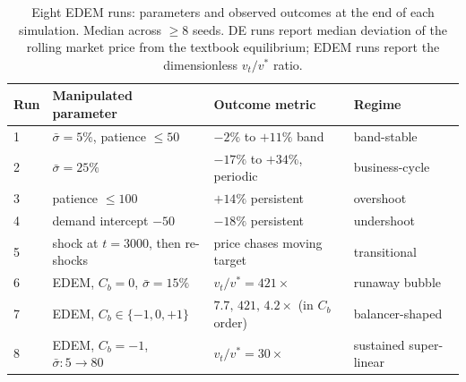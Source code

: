 \begin{table}[t]
\centering
\small
\caption{Eight EDEM runs: parameters and observed outcomes
at the end of each simulation. Median across $\ge 8$ seeds.
DE runs report median deviation of the rolling market price from the
textbook equilibrium; EDEM runs report the dimensionless
$v_{t}/v^{*}$ ratio.}
\label{tab:experiment-summary}
\begin{tabular}{l l l l}
\toprule
\textbf{Run} & \textbf{Manipulated parameter} & \textbf{Outcome metric} & \textbf{Regime} \\
\midrule
1 & $\bar{\sigma} = 5\%$, patience $\le 50$       & $-2\%$ to $+11\%$ band       & band-stable        \\
2 & $\bar{\sigma} = 25\%$                         & $-17\%$ to $+34\%$, periodic & business-cycle     \\
3 & patience $\le 100$                            & $+14\%$ persistent           & overshoot          \\
4 & demand intercept $-50$                        & $-18\%$ persistent           & undershoot         \\
5 & shock at $t=3000$, then re-shocks             & price chases moving target   & transitional       \\
\midrule
6 & EDEM, $C_{b} = 0$, $\bar{\sigma}=15\%$        & $v_{t}/v^{*} = 421\times$    & runaway bubble     \\
7 & EDEM, $C_{b} \in \{-1, 0, +1\}$               & $7.7,\,421,\,4.2\times$ (in $C_b$ order)    & balancer-shaped    \\
8 & EDEM, $C_{b} = -1$, $\bar{\sigma}: 5\to80$    & $v_{t}/v^{*} = 30\times$     & sustained super-linear \\
\bottomrule
\end{tabular}
\end{table}
